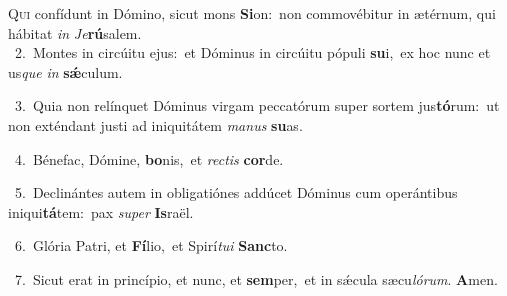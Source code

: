 \lettrine{\initial\textcolor{\initialcolor}{Q}}{ui} confídunt in Dómino, sicut mons \textbf{Si}\-on:~\star non commovébitur in ætérnum, qui hábitat \textit{in} \textit{Je}\-\textbf{rú}salem.\\
{\numbfont\textcolor{\numbcolor}{~2.}}~Montes in circúitu ejus:~\dagger et Dóminus in circúitu pópuli \textbf{su}\-i,~\star ex hoc nunc et us\textit{que} \textit{in} \textbf{sǽ}\-culum.\par
{\numbfont\textcolor{\numbcolor}{~3.}}~Quia non relínquet Dóminus virgam peccatórum super sortem jus\-\textbf{tó}\-rum:~\star ut non exténdant justi ad iniquitátem \textit{ma}\-\textit{nus} \textbf{su}\-as.\par
{\numbfont\textcolor{\numbcolor}{~4.}}~Bénefac, Dómine, \textbf{bo}\-nis,~\star et \textit{rec}\-\textit{tis} \textbf{cor}\-de.\par
{\numbfont\textcolor{\numbcolor}{~5.}}~Declinántes autem in obligatiónes addúcet Dóminus cum operántibus iniqui\-\textbf{tá}\-tem:~\star pax \textit{su}\-\textit{per} \textbf{Is}\-raël.\par
{\numbfont\textcolor{\numbcolor}{~6.}}~Glória Patri, et \textbf{Fí}\-lio,~\star et Spirí\-\textit{tu}\-\textit{i} \textbf{Sanc}\-to.\par
{\numbfont\textcolor{\numbcolor}{~7.}}~Sicut erat in princípio, et nunc, et \textbf{sem}\-per,~\star et in sǽcula sæcu\-\textit{ló}\-\textit{rum}. \textbf{A}\-men.\par
